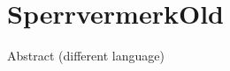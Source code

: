 %
\chapter*{SperrvermerkOld}
\vspace*{-10mm}
\blindtext
\vspace*{20mm}

{Abstract (different language)}\label{sec:abstract-diff} \\

\blindtext
